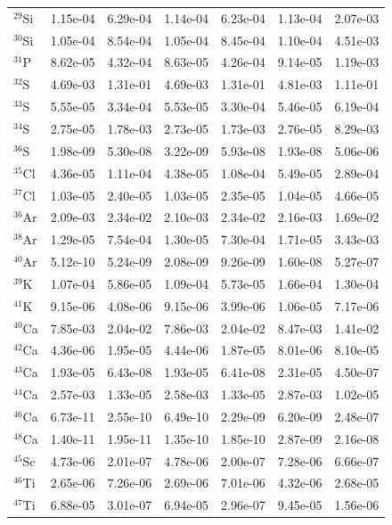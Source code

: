 \begin{table}
\begin{tabular}{l|cc|cc|cc}
$^{29}$Si & 1.15e-04 & 6.29e-04 & 1.14e-04 & 6.23e-04 & 1.13e-04 & 2.07e-03\\
$^{30}$Si & 1.05e-04 & 8.54e-04 & 1.05e-04 & 8.45e-04 & 1.10e-04 & 4.51e-03\\
$^{31}$P & 8.62e-05 & 4.32e-04 & 8.63e-05 & 4.26e-04 & 9.14e-05 & 1.19e-03\\
$^{32}$S & 4.69e-03 & 1.31e-01 & 4.69e-03 & 1.31e-01 & 4.81e-03 & 1.11e-01\\
$^{33}$S & 5.55e-05 & 3.34e-04 & 5.53e-05 & 3.30e-04 & 5.46e-05 & 6.19e-04\\
$^{34}$S & 2.75e-05 & 1.78e-03 & 2.73e-05 & 1.73e-03 & 2.76e-05 & 8.29e-03\\
$^{36}$S & 1.98e-09 & 5.30e-08 & 3.22e-09 & 5.93e-08 & 1.93e-08 & 5.06e-06\\
$^{35}$Cl & 4.36e-05 & 1.11e-04 & 4.38e-05 & 1.08e-04 & 5.49e-05 & 2.89e-04\\
$^{37}$Cl & 1.03e-05 & 2.40e-05 & 1.03e-05 & 2.35e-05 & 1.04e-05 & 4.66e-05\\
$^{36}$Ar & 2.09e-03 & 2.34e-02 & 2.10e-03 & 2.34e-02 & 2.16e-03 & 1.69e-02\\
$^{38}$Ar & 1.29e-05 & 7.54e-04 & 1.30e-05 & 7.30e-04 & 1.71e-05 & 3.43e-03\\
$^{40}$Ar & 5.12e-10 & 5.24e-09 & 2.08e-09 & 9.26e-09 & 1.60e-08 & 5.27e-07\\
$^{39}$K & 1.07e-04 & 5.86e-05 & 1.09e-04 & 5.73e-05 & 1.66e-04 & 1.30e-04\\
$^{41}$K & 9.15e-06 & 4.08e-06 & 9.15e-06 & 3.99e-06 & 1.06e-05 & 7.17e-06\\
$^{40}$Ca & 7.85e-03 & 2.04e-02 & 7.86e-03 & 2.04e-02 & 8.47e-03 & 1.41e-02\\
$^{42}$Ca & 4.36e-06 & 1.95e-05 & 4.44e-06 & 1.87e-05 & 8.01e-06 & 8.10e-05\\
$^{43}$Ca & 1.93e-05 & 6.43e-08 & 1.93e-05 & 6.41e-08 & 2.31e-05 & 4.50e-07\\
$^{44}$Ca & 2.57e-03 & 1.33e-05 & 2.58e-03 & 1.33e-05 & 2.87e-03 & 1.02e-05\\
$^{46}$Ca & 6.73e-11 & 2.55e-10 & 6.49e-10 & 2.29e-09 & 6.20e-09 & 2.48e-07\\
$^{48}$Ca & 1.40e-11 & 1.95e-11 & 1.35e-10 & 1.85e-10 & 2.87e-09 & 2.16e-08\\
$^{45}$Sc & 4.73e-06 & 2.01e-07 & 4.78e-06 & 2.00e-07 & 7.28e-06 & 6.66e-07\\
$^{46}$Ti & 2.65e-06 & 7.26e-06 & 2.69e-06 & 7.01e-06 & 4.32e-06 & 2.68e-05\\
$^{47}$Ti & 6.88e-05 & 3.01e-07 & 6.94e-05 & 2.96e-07 & 9.45e-05 & 1.56e-06\\

\end{tabular}
\end{table}
